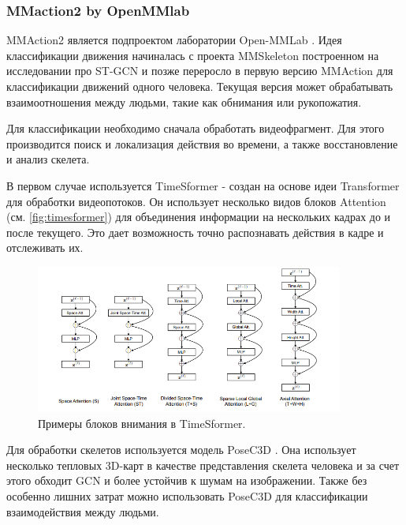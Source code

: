 \subsubsection{MMaction2 by OpenMMlab}
\label{subsubsec:mmaction2_desc}

MMAction2 является подпроектом лаборатории Open-MMLab \cite{2020mmaction2}. Идея классификации движения начиналась с проекта MMSkeleton построенном на исследовании про ST-GCN \cite{STGCN} и позже переросло в первую версию MMAction для классификации движений одного человека. Текущая версия может обрабатывать взаимоотношения между людьми, такие как обнимания или рукопожатия. 

Для классификации необходимо сначала обработать видеофрагмент. Для этого производится поиск и локализация действия во времени, а также восстановление и анализ скелета.

В первом случае используется TimeSformer \cite{TimeSformer} - создан на основе идеи Transformer для обработки видеопотоков. Он использует несколько видов блоков Attention (см. \autoref{fig:timesformer}) для объединения информации на нескольких кадрах до и после текущего. Это дает возможность точно распознавать действия в кадре и отслеживать их.

\begin{figure}[h]
	\centering
	\includegraphics[width=0.9\textwidth]{./images/Classificators/TimeSformer}
	\caption{Примеры блоков внимания в TimeSformer. \cite{TimeSformer}}
	\label{fig:timesformer}
\end{figure}

Для обработки скелетов используется модель PoseC3D \cite{duan2021revisiting}. Она использует несколько тепловых 3D-карт в качестве представления скелета человека и за счет этого обходит GCN и более устойчив к шумам на изображении. Также без особенно лишних затрат можно использовать PoseC3D для классификации взаимодействия между людьми.


